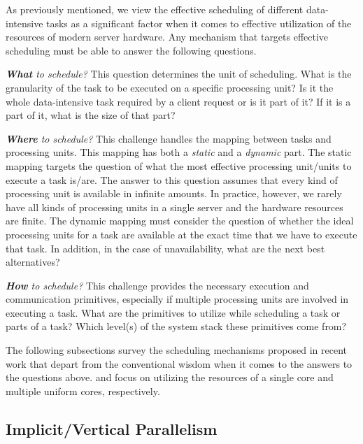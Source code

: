 \documentclass[11pt]{article}
\begin{document}
As previously mentioned,
we view the effective scheduling of different data-intensive tasks as a significant factor
when it comes to effective utilization of the resources of modern server hardware.
Any mechanism that targets effective scheduling must be able to answer the following questions. 

\textit{\textbf{What} to schedule?}
This question determines the unit of scheduling.
What is the granularity of the task to be executed on a specific processing unit?
Is it the whole data-intensive task required by a client request or is it part of it?
If it is a part of it, what is the size of that part?

\textit{\textbf{Where} to schedule?}
This challenge handles the mapping between tasks and processing units.
This mapping has both a \textit{static} and a \textit{dynamic} part.
The static mapping targets the question of what the most effective processing unit/units to execute a task is/are.
The answer to this question assumes that every kind of processing unit is available in infinite amounts.
In practice, however, we rarely have all kinds of processing units in a single server and the hardware resources are finite.
The dynamic mapping must consider the question of whether the ideal processing units
for a task are available at the exact time that we have to execute that task.
In addition, in the case of unavailability, what are the next best alternatives?

\textit{\textbf{How} to schedule?}
This challenge provides the necessary execution and communication primitives,
especially if multiple processing units are involved in executing a task.
What are the primitives to utilize while scheduling a task or parts of a task?
Which level(s) of the system stack these primitives come from? 

The following subsections survey the scheduling mechanisms proposed in recent work that
depart from the conventional wisdom when it comes to the answers to the questions above.
 and  focus on utilizing the resources of
a single core and multiple uniform cores, respectively.

\subsection{Implicit/Vertical Parallelism}
\label{sec:sched:impl}
\end{document}
